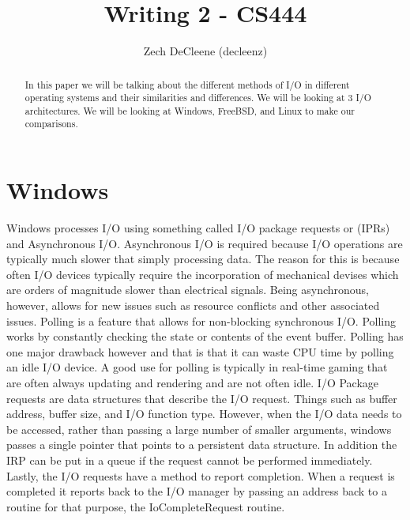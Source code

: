 \documentclass[letterpaper, 10pt, draftclsnofoot,onecolumn]{article}
\title{Writing 2 - CS444}
\author{Zech DeCleene (decleenz)}
\begin{document}
\maketitle

\begin{abstract}
In this paper we will be talking about the different methods of I/O in different operating systems and their similarities and differences. We will be looking at 3 I/O architectures. We will be looking at Windows, FreeBSD, and Linux to make our comparisons.
\end{abstract}

\section{Windows}
Windows processes I/O using something called I/O package requests or (IPRs) and Asynchronous I/O.
Asynchronous I/O is required because I/O operations are typically much slower that simply processing data. The reason for this is because often I/O devices typically require the incorporation of mechanical devises which are orders of magnitude slower than electrical signals. 
Being asynchronous, however, allows for new issues such as resource conflicts and other associated issues.
\newline
\newline
Polling is a feature that allows for non-blocking synchronous I/O. Polling works by constantly checking the state or contents of the event buffer. Polling has one major drawback however and that is that it can waste CPU time by polling an idle I/O device. A good use for polling is typically in real-time gaming that are often always updating and rendering and are not often idle.
\newline
\newline
I/O Package requests are data structures that describe the I/O request. Things such as buffer address, buffer size, and I/O function type. However, when the I/O data needs to be accessed, rather than passing a large number of smaller arguments, windows passes a single pointer that points to a persistent data structure. In addition the IRP can be put in a queue if the request cannot be performed immediately. Lastly, the I/O requests have a method to report completion. When a request is completed it reports back to the I/O manager by passing an address back to a routine for that purpose, the IoCompleteRequest routine.
\newpage
\end{document}
